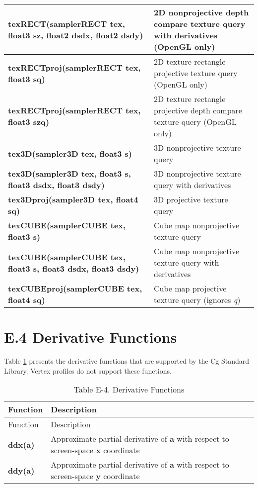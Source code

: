 \documentclass[../main.tex]{subfiles}
\begin{document}
\begin{longtable}{ p{5cm} p{7cm}  }
\hline
\textbf{texRECT(samplerRECT tex, float3 sz, float2 dsdx, float2 dsdy)} & 2D nonprojective depth compare texture query with derivatives (OpenGL only) \\
\hline
\textbf{texRECTproj(samplerRECT tex, float3 sq)} & 2D texture rectangle projective texture query (OpenGL only) \\
\hline
\textbf{texRECTproj(samplerRECT tex, float3 szq)} & 2D texture rectangle projective depth compare texture query (OpenGL only) \\
\hline
\textbf{tex3D(sampler3D tex, float3 s)} & 3D nonprojective texture query \\
\hline
\textbf{tex3D(sampler3D tex, float3 s, float3 dsdx, float3 dsdy)} & 3D nonprojective texture query with derivatives \\
\hline
\textbf{tex3Dproj(sampler3D tex, float4 sq)} & 3D projective texture query \\
\hline
\textbf{texCUBE(samplerCUBE tex, float3 s)} & Cube map nonprojective texture query \\
\hline
\textbf{texCUBE(samplerCUBE tex, float3 s, float3 dsdx, float3 dsdy)} & Cube map nonprojective texture query with derivatives \\
\hline
\textbf{texCUBEproj(samplerCUBE tex, float4 sq)} & Cube map projective texture query (ignores \textit{q}) \\
\hline

\end{longtable}
\FloatBarrier

\section{E.4 Derivative Functions}

Table \ref{table:E-4} presents the derivative functions that are supported by the Cg Standard Library. Vertex profiles do not support these functions.

\FloatBarrier
\begin{longtable}{ p{2cm} p{10cm}  }
\caption{Table E-4. Derivative Functions\label{table:E-4}} \\

Function & Description \\
\hline
\endfirsthead
Function & Description \\
\hline
\endhead
\endfoot
\endlastfoot

\textbf{ddx(a)} & Approximate partial derivative of \textbf{a} with respect to screen-space \textbf{x} coordinate \\
\hline
\textbf{ddy(a)} & Approximate partial derivative of \textbf{a} with respect to screen-space \textbf{y} coordinate \\
\hline

\end{longtable}
\FloatBarrier
\end{document}
